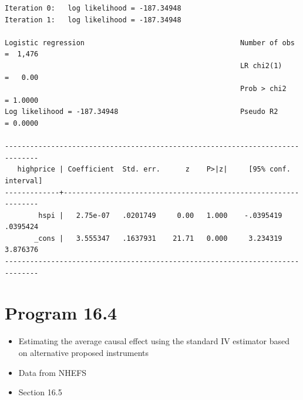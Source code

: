 \documentclass[
  10pt,
]{book}
\providecommand{\tightlist}{%
  \setlength{\itemsep}{0pt}\setlength{\parskip}{0pt}}
\begin{document}
\begin{verbatim}
Iteration 0:   log likelihood = -187.34948  
Iteration 1:   log likelihood = -187.34948  

Logistic regression                                     Number of obs =  1,476
                                                        LR chi2(1)    =   0.00
                                                        Prob > chi2   = 1.0000
Log likelihood = -187.34948                             Pseudo R2     = 0.0000

------------------------------------------------------------------------------
   highprice | Coefficient  Std. err.      z    P>|z|     [95% conf. interval]
-------------+----------------------------------------------------------------
        hspi |   2.75e-07   .0201749     0.00   1.000    -.0395419    .0395424
       _cons |   3.555347   .1637931    21.71   0.000     3.234319    3.876376
------------------------------------------------------------------------------
\end{verbatim}

\hypertarget{program-16.4-1}{%
\section{Program 16.4}\label{program-16.4-1}}

\begin{itemize}
\tightlist
\item
  Estimating the average causal effect using the standard IV estimator based on alternative proposed instruments
\item
  Data from NHEFS
\item
  Section 16.5
\end{itemize}
\end{document}
